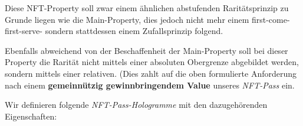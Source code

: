 \begin{NFT-Prop}

Diese NFT-Property soll zwar einem ähnlichen abstufenden Raritätsprinzip zu Grunde liegen wie die Main-Property, dies jedoch nicht mehr einem first-come-first-serve- sondern stattdessen einem Zufallsprinzip folgend.

Ebenfalls abweichend von der Beschaffenheit der Main-Property soll bei dieser Property die Rarität nicht mittels einer absoluten Obergrenze abgebildet werden, sondern mittels einer relativen. (Dies zahlt auf die oben formulierte Anforderung nach einem \textbf{gemeinnützig gewinnbringendem Value} unseres \textit{NFT-Pass} ein.

\vspace{0.3cm}

Wir definieren folgende \textit{NFT-Pass-Hologramme} mit den dazugehörenden Eigenschaften:


\end{NFT-Prop}
